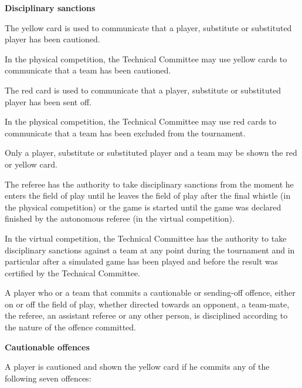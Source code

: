 \bigskip

{\bfseries Disciplinary sanctions}

\headlinebox

The yellow card is used to communicate that a player, substitute or substituted player has been cautioned.

In the physical competition, the Technical Committee may use yellow cards to communicate that a team has been cautioned.

\bigskip

The red card is used to communicate that a player, substitute or substituted player has been sent off.

In the physical competition, the Technical Committee may use red cards to communicate that a team has been excluded from the tournament.

\bigskip

Only a player, substitute or substituted player and a team may be shown the red or yellow card.

\bigskip

The referee has the authority to take disciplinary sanctions from the moment he enters the field of play until he leaves the field of play after the final whistle (in the physical competition)
or the game is started until the game was declared finished by the autonomous referee (in the virtual competition).

In the virtual competition, the Technical Committee has the authority to take disciplinary sanctions against a team at any point during the tournament and in particular after a simulated game has been played and before the result was certified by the Technical Committee.

\bigskip

A player who or a team that commits a cautionable or sending-off offence, either on or off the field of play, whether directed towards an opponent, a team-mate, the referee, an assistant referee or any other person, is disciplined according to the nature of the offence committed.

\bigskip

{\bfseries Cautionable offences }

\headlinebox

A player is cautioned and shown the yellow card if he commits any of the following seven offences:

